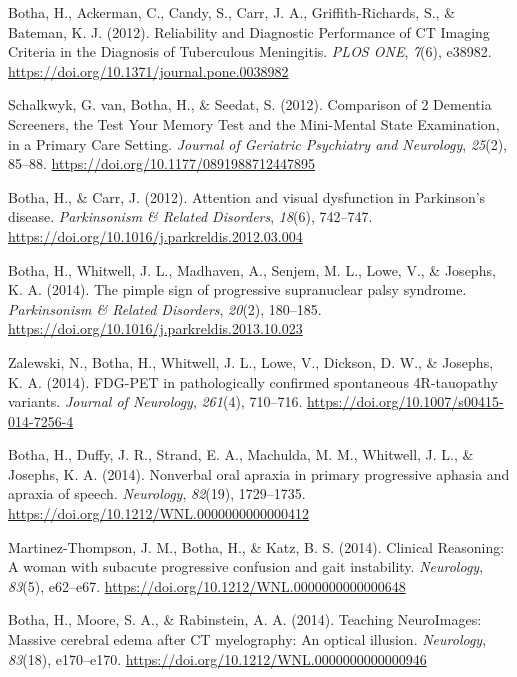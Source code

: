 \documentclass[11pt, a4paper]{awesome-cv}
\begin{document}
\leavevmode\hypertarget{ref-botha_reliability_2012}{}%
Botha, H., Ackerman, C., Candy, S., Carr, J. A., Griffith-Richards, S.,
\& Bateman, K. J. (2012). Reliability and {Diagnostic} {Performance} of
{CT} {Imaging} {Criteria} in the {Diagnosis} of {Tuberculous}
{Meningitis}. \emph{PLOS ONE}, \emph{7}(6), e38982.
\url{https://doi.org/10.1371/journal.pone.0038982}

\leavevmode\hypertarget{ref-van_schalkwyk_comparison_2012}{}%
Schalkwyk, G. van, Botha, H., \& Seedat, S. (2012). Comparison of 2
{Dementia} {Screeners}, the {Test} {Your} {Memory} {Test} and the
{Mini}-{Mental} {State} {Examination}, in a {Primary} {Care} {Setting}.
\emph{Journal of Geriatric Psychiatry and Neurology}, \emph{25}(2),
85--88. \url{https://doi.org/10.1177/0891988712447895}

\leavevmode\hypertarget{ref-botha_attention_2012}{}%
Botha, H., \& Carr, J. (2012). Attention and visual dysfunction in
{Parkinson}'s disease. \emph{Parkinsonism \& Related Disorders},
\emph{18}(6), 742--747.
\url{https://doi.org/10.1016/j.parkreldis.2012.03.004}

\leavevmode\hypertarget{ref-botha_pimple_2014}{}%
Botha, H., Whitwell, J. L., Madhaven, A., Senjem, M. L., Lowe, V., \&
Josephs, K. A. (2014). The pimple sign of progressive supranuclear palsy
syndrome. \emph{Parkinsonism \& Related Disorders}, \emph{20}(2),
180--185. \url{https://doi.org/10.1016/j.parkreldis.2013.10.023}

\leavevmode\hypertarget{ref-zalewski_fdg-pet_2014}{}%
Zalewski, N., Botha, H., Whitwell, J. L., Lowe, V., Dickson, D. W., \&
Josephs, K. A. (2014). {FDG}-{PET} in pathologically confirmed
spontaneous {4R}-tauopathy variants. \emph{Journal of Neurology},
\emph{261}(4), 710--716. \url{https://doi.org/10.1007/s00415-014-7256-4}

\leavevmode\hypertarget{ref-botha_nonverbal_2014}{}%
Botha, H., Duffy, J. R., Strand, E. A., Machulda, M. M., Whitwell, J.
L., \& Josephs, K. A. (2014). Nonverbal oral apraxia in primary
progressive aphasia and apraxia of speech. \emph{Neurology},
\emph{82}(19), 1729--1735.
\url{https://doi.org/10.1212/WNL.0000000000000412}

\leavevmode\hypertarget{ref-martinez-thompson_clinical_2014}{}%
Martinez-Thompson, J. M., Botha, H., \& Katz, B. S. (2014). Clinical
{Reasoning}: {A} woman with subacute progressive confusion and gait
instability. \emph{Neurology}, \emph{83}(5), e62--e67.
\url{https://doi.org/10.1212/WNL.0000000000000648}

\leavevmode\hypertarget{ref-botha_teaching_2014}{}%
Botha, H., Moore, S. A., \& Rabinstein, A. A. (2014). Teaching
{NeuroImages}: {Massive} cerebral edema after {CT} myelography: {An}
optical illusion. \emph{Neurology}, \emph{83}(18), e170--e170.
\url{https://doi.org/10.1212/WNL.0000000000000946}
\end{document}
